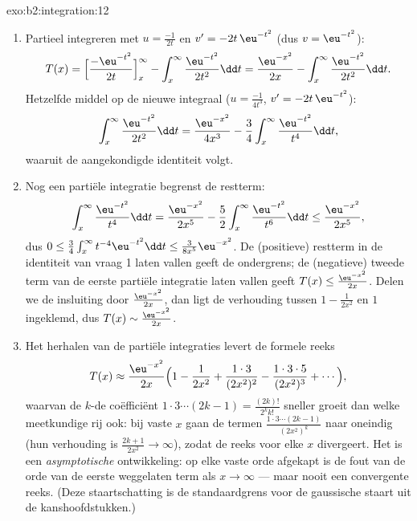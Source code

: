 \begin{solution}{exo:b2:integration:12}
\begin{enumerate}
  \item Partieel integreren met $u = \frac{-1}{2t}$ en $v' =
        -2t\,\eu^{-t^2}$ (dus $v = \eu^{-t^2}$):
        \[
        T(x) = \Bigl[\frac{-\eu^{-t^2}}{2t}\Bigr]_x^\infty
        - \int_x^\infty \frac{\eu^{-t^2}}{2t^2}\dd t
        = \frac{\eu^{-x^2}}{2x}
        - \int_x^\infty \frac{\eu^{-t^2}}{2t^2}\dd t .
        \]
        Hetzelfde middel op de nieuwe integraal ($u =
        \frac{-1}{4t^3}$, $v' = -2t\,\eu^{-t^2}$):
        \[
        \int_x^\infty \frac{\eu^{-t^2}}{2t^2}\dd t
        = \frac{\eu^{-x^2}}{4x^3}
        - \frac34\int_x^\infty \frac{\eu^{-t^2}}{t^4}\dd t ,
        \]
        waaruit de aangekondigde identiteit volgt.
  \item Nog een partiële integratie begrenst de restterm:
        \[
        \int_x^\infty \frac{\eu^{-t^2}}{t^4}\dd t
        = \frac{\eu^{-x^2}}{2x^5}
        - \frac52\int_x^\infty\frac{\eu^{-t^2}}{t^6}\dd t
        \leq \frac{\eu^{-x^2}}{2x^5},
        \]
        dus $0 \leq \frac34\int_x^\infty t^{-4}\eu^{-t^2}\dd t
        \leq \frac{3}{8x^5}\eu^{-x^2}$. De (positieve) restterm in
        de identiteit van vraag 1 laten vallen geeft de ondergrens;
        de (negatieve) tweede term van de eerste partiële
        integratie laten vallen geeft $T(x) \leq
        \frac{\eu^{-x^2}}{2x}$. Delen we de insluiting door
        $\frac{\eu^{-x^2}}{2x}$, dan ligt de verhouding tussen $1 -
        \frac{1}{2x^2}$ en $1$ ingeklemd, dus $T(x) \sim
        \frac{\eu^{-x^2}}{2x}$.
  \item Het herhalen van de partiële integraties levert de formele
        reeks
        \[
        T(x) \approx \frac{\eu^{-x^2}}{2x}\Bigl(1 -
        \frac{1}{2x^2} + \frac{1\cdot3}{(2x^2)^2} -
        \frac{1\cdot3\cdot5}{(2x^2)^3} + \cdots\Bigr),
        \]
        waarvan de $k$-de coëfficiënt $1\cdot3\cdots(2k-1) =
        \frac{(2k)!}{2^k k!}$ sneller groeit dan welke meetkundige
        rij ook: bij vaste $x$ gaan de termen
        $\frac{1\cdot3\cdots(2k-1)}{(2x^2)^k}$ naar oneindig (hun
        verhouding is $\frac{2k+1}{2x^2} \to \infty$), zodat de
        reeks voor elke $x$ divergeert. Het is een
        \emph{asymptotische} ontwikkeling: op elke vaste orde
        afgekapt is de fout van de orde van de eerste weggelaten
        term als $x \to \infty$ --- maar nooit een convergente
        reeks. (Deze staartschatting is de standaardgrens voor de
        gaussische staart uit de kanshoofdstukken.)
\end{enumerate}
\end{solution}

